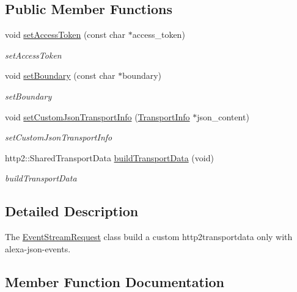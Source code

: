 \subsection*{Public Member Functions}
\begin{DoxyCompactItemize}
\item 
void \hyperlink{classAlexaEvent_1_1EventStreamRequest_aa2dba1096313c98d24709adb2c03dcf0}{set\+Access\+Token} (const char $\ast$access\+\_\+token)
\begin{DoxyCompactList}\small\item\em set\+Access\+Token \end{DoxyCompactList}\item 
void \hyperlink{classAlexaEvent_1_1EventStreamRequest_a2daacbd57363d40dae81c8be99b50346}{set\+Boundary} (const char $\ast$boundary)
\begin{DoxyCompactList}\small\item\em set\+Boundary \end{DoxyCompactList}\item 
void \hyperlink{classAlexaEvent_1_1EventStreamRequest_ac9768da8142180ef8dcd53268ffb3a8e}{set\+Custom\+Json\+Transport\+Info} (\hyperlink{classAlexaEvent_1_1TransportInfo}{Transport\+Info} $\ast$json\+\_\+content)
\begin{DoxyCompactList}\small\item\em set\+Custom\+Json\+Transport\+Info \end{DoxyCompactList}\item 
http2\+::\+Shared\+Transport\+Data \hyperlink{classAlexaEvent_1_1EventStreamRequest_a54ffbcf4baef4f0426cf8baf34483b74}{build\+Transport\+Data} (void)
\begin{DoxyCompactList}\small\item\em build\+Transport\+Data \end{DoxyCompactList}\end{DoxyCompactItemize}


\subsection{Detailed Description}
The \hyperlink{classAlexaEvent_1_1EventStreamRequest}{Event\+Stream\+Request} class build a custom http2transportdata only with alexa-\/json-\/events. 

\subsection{Member Function Documentation}
\mbox{\label{classAlexaEvent_1_1EventStreamRequest_a54ffbcf4baef4f0426cf8baf34483b74}} 
